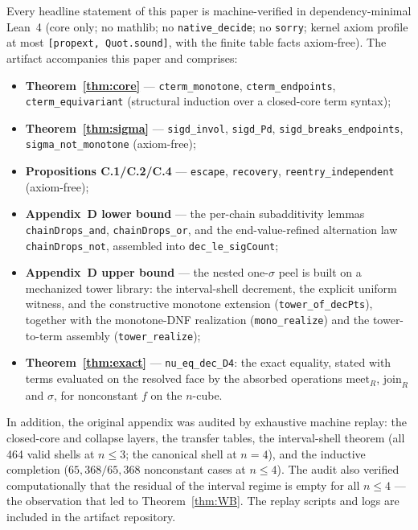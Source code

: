 \documentclass[11pt]{article}
\theoremstyle{remark}
\newcommand{\meetR}{\ensuremath{\mathrm{meet}_R}}
\newcommand{\joinR}{\ensuremath{\mathrm{join}_R}}
\begin{document}
Every headline statement of this paper is machine-verified in
dependency-minimal Lean~4 (core only; no mathlib; no
\texttt{native\_decide}; no \texttt{sorry}; kernel axiom profile at most
\texttt{[propext, Quot.sound]}, with the finite table facts axiom-free).
The artifact accompanies this paper and comprises:
\begin{itemize}
\item \textbf{Theorem~\ref{thm:core}} --- \texttt{cterm\_monotone},
  \texttt{cterm\_endpoints}, \texttt{cterm\_equivariant} (structural
  induction over a closed-core term syntax);
\item \textbf{Theorem~\ref{thm:sigma}} --- \texttt{sigd\_invol},
  \texttt{sigd\_Pd}, \texttt{sigd\_breaks\_endpoints},
  \texttt{sigma\_not\_monotone} (axiom-free);
\item \textbf{Propositions C.1/C.2/C.4} --- \texttt{escape},
  \texttt{recovery}, \texttt{reentry\_independent} (axiom-free);
\item \textbf{Appendix~D lower bound} --- the per-chain subadditivity
  lemmas \texttt{chainDrops\_and}, \texttt{chainDrops\_or}, and the
  end-value-refined alternation law \texttt{chainDrops\_not}, assembled
  into \texttt{dec\_le\_sigCount};
\item \textbf{Appendix~D upper bound} --- the nested one-$\sigma$ peel is
  built on a mechanized tower library: the interval-shell decrement, the
  explicit uniform witness, and the constructive monotone extension
  (\texttt{tower\_of\_decPts}), together with the monotone-DNF realization
  (\texttt{mono\_realize}) and the tower-to-term assembly
  (\texttt{tower\_realize});
\item \textbf{Theorem~\ref{thm:exact}} --- \texttt{nu\_eq\_dec\_D4}: the
  exact equality, stated with terms evaluated on the resolved face by the
  absorbed operations $\meetR$, $\joinR$ and $\sigma$, for nonconstant $f$
  on the $n$-cube.
\end{itemize}

In addition, the original appendix was audited by exhaustive machine
replay: the closed-core and collapse layers, the transfer tables, the
interval-shell theorem (all 464 valid shells at $n\le 3$; the canonical
shell at $n=4$), and the inductive completion ($65{,}368/65{,}368$
nonconstant cases at $n\le 4$). The audit also verified computationally
that the residual of the interval regime is empty for all $n\le 4$ --- the
observation that led to Theorem~\ref{thm:WB}. The replay scripts and logs
are included in the artifact repository.
\end{document}

